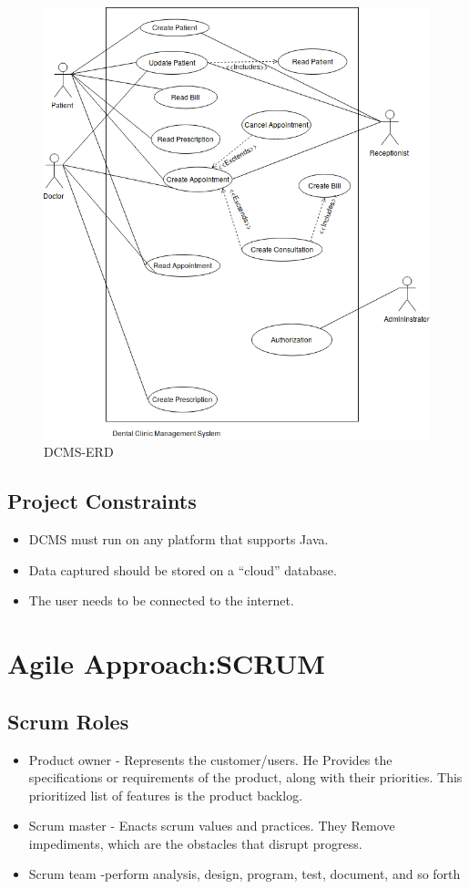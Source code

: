 \documentclass[11 pt]{article}
\begin{document}
\begin{figure}[h]
    \centering
    \includegraphics[scale = 0.5]{Use Case Diagram.png}
    \caption{DCMS-ERD}
    \label{fig:ERD}
    \end{figure}

    \subsection{Project Constraints}
    \begin{itemize}
    \item
    DCMS must run on any platform that supports Java.
    \item
    Data captured should be stored on a “cloud” database.
    \item
    The user needs to be connected to the internet.
    \end{itemize}

  \section{Agile Approach:SCRUM}
\subsection{Scrum Roles}
\begin{itemize}
    \item
    Product owner - Represents the customer/users.  He Provides the specifications or requirements of the product, along with their priorities. This prioritized list of features is the product backlog.
    \item
    Scrum master - Enacts scrum values and practices. They Remove impediments, which are the obstacles that disrupt progress.
    \item
    Scrum team -perform analysis, design, program, test, document, and so forth
    \end{itemize}
\end{document}

